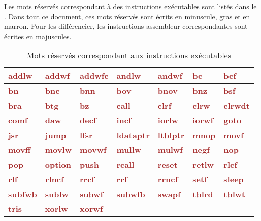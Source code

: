 Les mots réservés correspondant à des instructions exécutables sont listés dans le . Dans tout ce document, ces mots réservés sont écrits en minuscule, gras et en marron. Pour les différencier, les instructions assembleur correspondantes sont écrites en majuscules.


\newcommand\keyWordInstruction[1]{\textcolor{brown}{\bf#1}}

\begin{table}[ht]
  \centering
\begin{tabular}{|l|l|l|l|l|l|l|}
  \hline
    \keyWordInstruction{addlw} & \keyWordInstruction{addwf} & \keyWordInstruction{addwfc} & \keyWordInstruction{andlw} & \keyWordInstruction{andwf} & \keyWordInstruction{bc} & \keyWordInstruction{bcf} \\
  \hline
    \keyWordInstruction{bn} & \keyWordInstruction{bnc} & \keyWordInstruction{bnn} & \keyWordInstruction{bov} & \keyWordInstruction{bnov} & \keyWordInstruction{bnz} & \keyWordInstruction{bsf} \\
  \hline
    \keyWordInstruction{bra} & \keyWordInstruction{btg} & \keyWordInstruction{bz} & \keyWordInstruction{call} & \keyWordInstruction{clrf} & \keyWordInstruction{clrw} & \keyWordInstruction{clrwdt} \\
  \hline
    \keyWordInstruction{comf} & \keyWordInstruction{daw} & \keyWordInstruction{decf} & \keyWordInstruction{incf} & \keyWordInstruction{iorlw} & \keyWordInstruction{iorwf} & \keyWordInstruction{goto} \\
  \hline
    \keyWordInstruction{jsr} & \keyWordInstruction{jump} & \keyWordInstruction{lfsr} & \keyWordInstruction{ldataptr} & \keyWordInstruction{ltblptr} & \keyWordInstruction{mnop} & \keyWordInstruction{movf} \\
  \hline
    \keyWordInstruction{movff} & \keyWordInstruction{movlw} & \keyWordInstruction{movwf} & \keyWordInstruction{mullw} & \keyWordInstruction{mulwf} & \keyWordInstruction{negf} & \keyWordInstruction{nop} \\
  \hline
    \keyWordInstruction{pop} & \keyWordInstruction{option} & \keyWordInstruction{push} & \keyWordInstruction{rcall} & \keyWordInstruction{reset} & \keyWordInstruction{retlw} & \keyWordInstruction{rlcf} \\
  \hline
    \keyWordInstruction{rlf} & \keyWordInstruction{rlncf} & \keyWordInstruction{rrcf} & \keyWordInstruction{rrf} & \keyWordInstruction{rrncf} & \keyWordInstruction{setf} & \keyWordInstruction{sleep} \\
  \hline
    \keyWordInstruction{subfwb} & \keyWordInstruction{sublw} & \keyWordInstruction{subwf} & \keyWordInstruction{subwfb} & \keyWordInstruction{swapf} & \keyWordInstruction{tblrd} & \keyWordInstruction{tblwt}\\
  \hline
    \keyWordInstruction{tris} & \keyWordInstruction{xorlw} & \keyWordInstruction{xorwf} & & & & \\
  \hline
\end{tabular}
  \caption{Mots réservés correspondant aux instructions exécutables}
\end{table}



